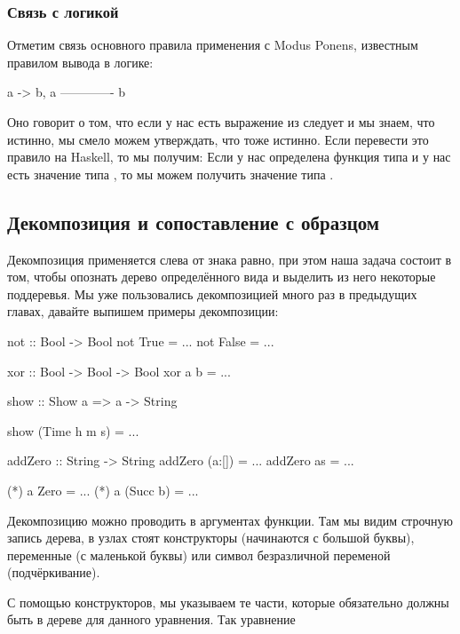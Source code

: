\subsubsection{Связь с логикой}

Отметим связь основного правила применения с Modus Ponens, известным
правилом вывода в логике:


\begin{code}
                    a -> b,    a
                    -------------
                          b
\end{code}

Оно говорит о том, что если у нас есть выражение из  следует
 и мы знаем, что  истинно, мы смело можем утверждать, что
 тоже истинно. Если перевести это правило на Haskell, то мы
получим: Если у нас определена функция типа  и у нас есть
значение типа , то мы можем получить значение типа .

\subsection{Декомпозиция и сопоставление с образцом}

Декомпозиция применяется слева от знака равно, при этом наша задача
состоит в том, чтобы опознать дерево определённого вида и выделить из
него некоторые поддеревья. Мы уже пользовались декомпозицией много раз в
предыдущих главах, давайте выпишем примеры декомпозиции:


\begin{code}
not :: Bool -> Bool
not True   = ...
not False  = ...

xor :: Bool -> Bool -> Bool
xor a b = ...

show :: Show a => a -> String

show (Time h m s) = ...

addZero :: String -> String
addZero (a:[])  = ...
addZero as      = ...

(*)  a   Zero      = ...
(*)  a   (Succ b)  = ...
\end{code}

Декомпозицию можно проводить в аргументах функции. Там мы видим строчную
запись дерева, в узлах стоят конструкторы (начинаются с большой буквы),
переменные (с маленькой буквы) или символ безразличной переменой
(подчёркивание).

С помощью конструкторов, мы указываем те части, которые обязательно
должны быть в дереве для данного уравнения. Так уравнение


